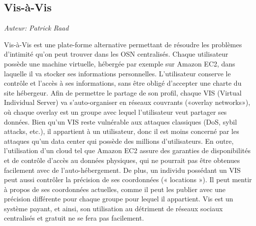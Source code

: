\subsection{Vis-à-Vis}

\begin{flushright}\textit{Auteur: Patrick Raad}\end{flushright}

Vis-à-Vis est une plate-forme alternative permettant de résoudre les problèmes
d’intimité qu’on peut trouver dans les OSN centralisés. \cite{vis-a-vis} Chaque
utilisateur possède une machine virtuelle, hébergée par exemple sur Amazon EC2,
dans laquelle il va stocker ses informations personnelles. L’utilisateur
conserve le contrôle et l’accès à ses informations, sans être obligé d’accepter une
charte du site hébergeur. Afin de permettre le partage de son profil, chaque
VIS (Virtual Individual Server) va s’auto-organiser en réseaux couvrants 
(«overlay networks»), où chaque overlay est un groupe avec lequel l’utilisateur
veut partager ses données. Bien qu’un VIS reste vulnérable aux attaques
classiques (DoS, sybil attacks, etc.), il appartient à un utilisateur, donc il est
moins concerné par les attaques qu’un data center qui possède des millions
d’utilisateurs. En outre, l’utilisation d’un cloud tel que Amazon EC2 assure
des garanties de disponibilités et de contrôle d’accès au données physiques, qui
ne pourrait pas être obtenues facilement avec de l’auto-hébergement. De plus,
un individu possédant un VIS peut aussi contrôler la précision de ses
coordonnées (« locations »). Il peut mentir à propos de ses coordonnées
actuelles, comme il peut les publier avec une précision différente pour chaque
groupe pour lequel il appartient. Vis est un système payant, et ainsi, son
utilisation au détriment de réseaux sociaux centralisés et gratuit ne se fera
pas facilement.
